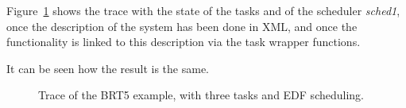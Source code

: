 Figure~\ref{fig:brt5_xml_trace} shows the trace with the state of the
tasks and of the scheduler \emph{sched1}, once the description of the system
has been done in XML, and once the functionality is linked to this
description via the task wrapper functions.

It can be seen how the result is the same.


\begin{figure}[h]
\centering
\caption{Trace of the BRT5 example, with three tasks and EDF scheduling.} 
\label{fig:brt5_xml_trace}
\end{figure}
